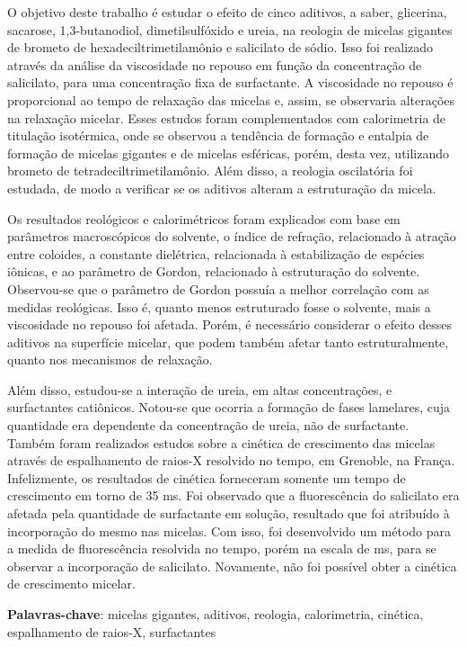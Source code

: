 \documentclass[
	12pt,				%
	openright,			%
	twoside,			%
	a4paper,			%
	english,			%
	brazil%
	]{abntex2}
\begin{document}

\setlength{\absparsep}{18pt} %
\begin{resumo}
 	O objetivo deste trabalho é estudar o efeito de cinco aditivos, a saber, glicerina, sacarose, 1,3-butanodiol, dimetilsulfóxido e ureia, na reologia de micelas gigantes de brometo de hexadeciltrimetilamônio e salicilato de sódio. Isso foi realizado através da análise da viscosidade no repouso em função da concentração de salicilato, para uma concentração fixa de surfactante. A viscosidade no repouso é proporcional ao tempo de relaxação das micelas e, assim, se observaria alterações na relaxação micelar. Esses estudos foram complementados com calorimetria de titulação isotérmica, onde se observou a tendência de formação e entalpia de formação de micelas gigantes e de micelas esféricas, porém, desta vez, utilizando brometo de tetradeciltrimetilamônio. Além disso, a reologia oscilatória foi estudada, de modo a verificar se os aditivos alteram a estruturação da micela.
 	
	Os resultados reológicos e calorimétricos foram explicados com base em parâmetros macroscópicos do solvente, o índice de refração, relacionado à atração entre coloides, a constante dielétrica, relacionada à estabilização de espécies iônicas, e ao parâmetro de Gordon, relacionado à estruturação do solvente. Observou-se que o parâmetro de Gordon possuía a melhor correlação com as medidas reológicas. Isso é, quanto menos estruturado fosse o solvente, mais a viscosidade no repouso foi afetada. Porém, é necessário considerar o efeito desses aditivos na superfície micelar, que podem também afetar tanto estruturalmente, quanto nos mecanismos de relaxação.
	
	Além disso, estudou-se a interação de ureia, em altas concentrações, e surfactantes catiônicos. Notou-se que ocorria a formação de fases lamelares, cuja quantidade era dependente da concentração de ureia, não de surfactante. Também foram realizados estudos sobre a cinética de crescimento das micelas através de espalhamento de raios-X resolvido no tempo, em Grenoble, na França. Infelizmente, os resultados de cinética forneceram somente um tempo de crescimento em torno de 35 ms. Foi observado que a fluorescência do salicilato era afetada pela quantidade de surfactante em solução, resultado que foi atribuído à incorporação do mesmo nas micelas. Com isso, foi desenvolvido um método para a medida de fluorescência resolvida no tempo, porém na escala de ms, para se observar a incorporação de salicilato. Novamente, não foi possível obter a cinética de crescimento micelar.
	
 \textbf{Palavras-chave}: micelas gigantes, aditivos, reologia, calorimetria, cinética, espalhamento de raios-X, surfactantes
\end{resumo}
\end{document}
